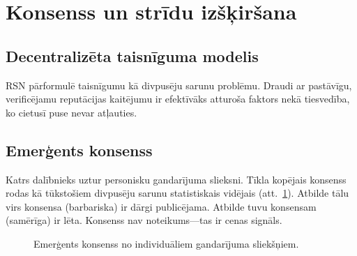 \documentclass[11pt,a4paper,twocolumn]{article}
\begin{document}
\section{Konsenss un strīdu izšķiršana}

\subsection{Decentralizēta taisnīguma modelis}

RSN pārformulē taisnīgumu kā divpusēju sarunu problēmu. Draudi ar pastāvīgu, verificējamu reputācijas kaitējumu ir efektīvāks attur\-oša faktors nekā tiesvedība, ko cietusī puse nevar atļauties.

\subsection{Emerģents konsenss}

Katrs dalībnieks uztur personisku gandarījuma slieksni. Tīkla kopējais konsenss rodas kā tūkstošiem divpusēju sarunu statistiskais vidējais (att.~\ref{fig:consensus}). Atbilde tālu virs konsensa (barbariska) ir dārgi publicējama. Atbilde tuvu konsensam (samērīga) ir lēta. Konsenss nav noteikums---tas ir cenas signāls.

\begin{figure}[ht]
\centering
{}
\caption{Emerģents konsenss no individuāliem gandarījuma sliekšņiem.}
\label{fig:consensus}
\end{figure}
\end{document}
